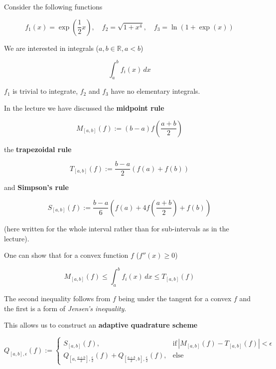 
    Consider the following functions

    \begin{equation}
        f_1(x) = \exp{\left(\frac{1}{2}x\right)}, \quad f_2 = \sqrt{1+x^4}, \quad f_3 = \ln{\left(1+\exp{(x)}\right)}
    \end{equation}

    We are interested in integrals ($a,b\in \mathbb{R}, a<b$)

    \begin{equation}
        \int_{a}^{b} f_i(x) \, dx
    \end{equation}

    $f_1$ is trivial to integrate, $f_2$ and $f_3$ have no elementary integrals.

    In the lecture we have discussed the \textbf{midpoint rule}

    \begin{equation}
        M_{[a, b]}(f) := (b-a) f\left( \frac{a+b}{2} \right)
    \end{equation}

    the \textbf{trapezoidal rule}

    \begin{equation}
        T_{[a, b]}(f) := \frac{b-a}{2} \left( f(a) + f(b) \right)
    \end{equation}

    and \textbf{Simpson's rule}

    \begin{equation}
        S_{[a, b]}(f) := \frac{b-a}{6} \left( f(a) + 4 f\left( \frac{a+b}{2} \right) +  f(b) \right)
    \end{equation}

    (here written for the whole interval rather than
    for sub-intervals as in the lecture).

    One can show that for a convex function $f$ ($f''(x) \geq 0$)

    \begin{equation}
        M_{[a, b]}(f) \leq \int_{a}^{b} f_i(x) \, dx \leq T_{[a, b]}(f)
    \end{equation}

    The second inequality follows from $f$ being under the tangent
    for a convex $f$ and the first is a form of \textit{Jensen's inequality}.

    This allows us to construct an \textbf{adaptive quadrature scheme}

    \begin{equation}
        Q_{[a,b],\epsilon}(f) := \begin{cases}
            S_{[a,b]}(f), &\text{if} \, |M_{[a, b]}(f) - T_{[a, b]}(f)| < \epsilon \\
            Q_{\left[a,\frac{a+b}{2}\right],\frac{\epsilon}{2}}(f) + Q_{\left[\frac{a+b}{2},b\right],\frac{\epsilon}{2}}(f), &\text{else}
        \end{cases}
    \end{equation}

